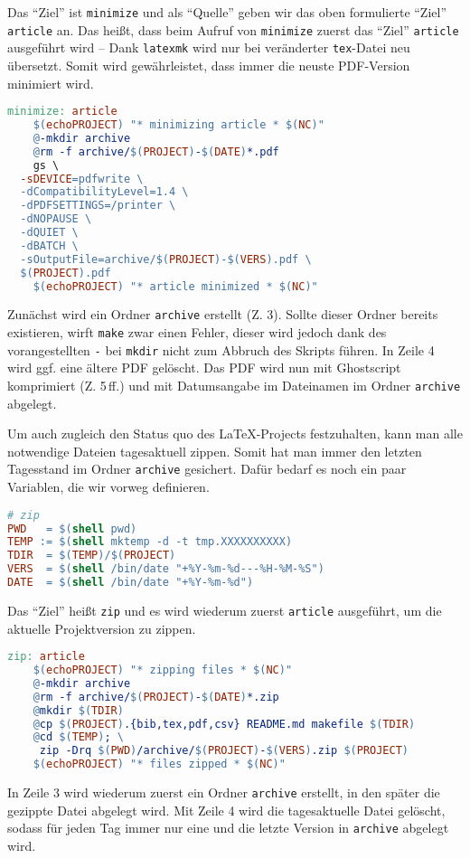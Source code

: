 \documentclass[ngerman]{dtk}
\begin{document}
Das \enquote{Ziel} ist \texttt{minimize} und als \enquote{Quelle}
geben wir das oben formulierte \enquote{Ziel} \texttt{article} an.
Das heißt, dass beim Aufruf von \texttt{minimize} zuerst das
\enquote{Ziel} \texttt{article} ausgeführt wird -- Dank \texttt{latexmk} wird nur
bei veränderter \texttt{tex}-Datei neu übersetzt.
Somit wird gewährleistet, dass  immer die neuste PDF-Version
minimiert wird.
\begin{lstlisting}[style=number,language=make]
minimize: article
	$(echoPROJECT) "* minimizing article * $(NC)"
	@-mkdir archive
	@rm -f archive/$(PROJECT)-$(DATE)*.pdf
	gs \
  -sDEVICE=pdfwrite \
  -dCompatibilityLevel=1.4 \
  -dPDFSETTINGS=/printer \
  -dNOPAUSE \
  -dQUIET \
  -dBATCH \
  -sOutputFile=archive/$(PROJECT)-$(VERS).pdf \
  $(PROJECT).pdf
	$(echoPROJECT) "* article minimized * $(NC)"
\end{lstlisting}
Zunächst wird ein Ordner \texttt{archive} erstellt (Z. 3).
Sollte dieser Ordner bereits existieren,
wirft \texttt{make} zwar einen Fehler,
dieser wird jedoch dank des vorangestellten \texttt{-} bei \texttt{mkdir} nicht zum Abbruch des Skripts führen.
In Zeile 4 wird ggf. eine ältere PDF gelöscht.
Das PDF wird nun mit Ghostscript komprimiert (Z. 5\,ff.)
und mit Datumsangabe im Dateinamen im Ordner \texttt{archive} abgelegt.

Um auch zugleich den Status quo des \LaTeX -Projects festzuhalten,
kann man alle notwendige Dateien tagesaktuell zippen.
Somit hat man immer den letzten Tagesstand im Ordner \texttt{archive} gesichert.
Dafür bedarf es noch ein paar Variablen,
die wir vorweg definieren.
\begin{lstlisting}[style=number,language=make]
# zip
PWD   = $(shell pwd)
TEMP := $(shell mktemp -d -t tmp.XXXXXXXXXX)
TDIR  = $(TEMP)/$(PROJECT)
VERS  = $(shell /bin/date "+%Y-%m-%d---%H-%M-%S")
DATE  = $(shell /bin/date "+%Y-%m-%d")
\end{lstlisting}

Das \enquote{Ziel} heißt \texttt{zip} und es wird wiederum
zuerst \texttt{article} ausgeführt,
um die aktuelle Projektversion zu zippen.
\begin{lstlisting}[style=number,language=make]
zip: article
	$(echoPROJECT) "* zipping files * $(NC)"
	@-mkdir archive
	@rm -f archive/$(PROJECT)-$(DATE)*.zip
	@mkdir $(TDIR)
    @cp $(PROJECT).{bib,tex,pdf,csv} README.md makefile $(TDIR)
	@cd $(TEMP); \
	 zip -Drq $(PWD)/archive/$(PROJECT)-$(VERS).zip $(PROJECT)
	$(echoPROJECT) "* files zipped * $(NC)"
\end{lstlisting}
In Zeile 3 wird wiederum zuerst ein Ordner \texttt{archive} erstellt,
in den später die gezippte Datei abgelegt wird.
Mit Zeile 4 wird die tagesaktuelle Datei gelöscht,
sodass für jeden Tag immer nur eine und die letzte Version in \texttt{archive} abgelegt wird.
\end{document}
